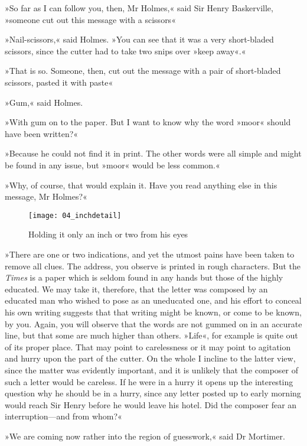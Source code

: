 »So far as I can follow you, then, Mr Holmes,« said Sir Henry Baskerville, »someone cut out this message with a scissors\longdash«

»Nail-scissors,« said Holmes. »You can see that it was a very short-bladed scissors, since the cutter had to take two snips over »keep away«.«

»That is so. Someone, then, cut out the message with a pair of short-bladed scissors, pasted it with paste\longdash«

»Gum,« said Holmes.

»With gum on to the paper. But I want to know why the word »moor« should have been written?«

»Because he could not find it in print. The other words were all simple and might be found in any issue, but »moor« would be less common.«

»Why, of course, that would explain it. Have you read anything else in this message, Mr Holmes?«

\begin{figure}[tbh]
\centering
\texttt{[image: 04\_inchdetail]}
\caption{Holding it only an inch or two from his eyes}
\end{figure}

»There are one or two indications, and yet the utmost pains have been taken to remove all clues. The address, you observe is printed in rough characters. But the \textit{Times} is a paper which is seldom found in any hands but those of the highly educated. We may take it, therefore, that the letter was composed by an educated man who wished to pose as an uneducated one, and his effort to conceal his own writing suggests that that writing might be known, or come to be known, by you. Again, you will observe that the words are not gummed on in an accurate line, but that some are much higher than others. »Life«, for example is quite out of its proper place. That may point to carelessness or it may point to agitation and hurry upon the part of the cutter. On the whole I incline to the latter view, since the matter was evidently important, and it is unlikely that the composer of such a letter would be careless. If he were in a hurry it opens up the interesting question why he should be in a hurry, since any letter posted up to early morning would reach Sir Henry before he would leave his hotel. Did the composer fear an interruption—and from whom?«

»We are coming now rather into the region of guesswork,« said Dr Mortimer.

